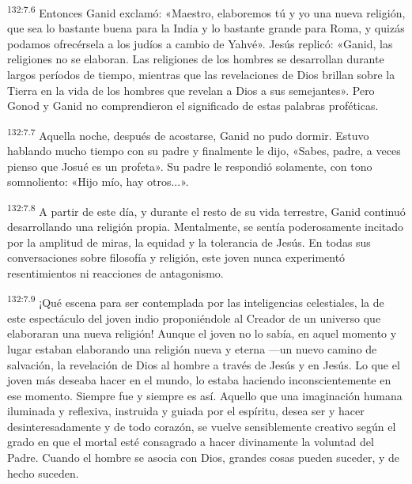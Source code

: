 \par 
\textsuperscript{132:7.6} Entonces Ganid exclamó: «Maestro, elaboremos tú y yo una nueva religión, que sea lo bastante buena para la India y lo bastante grande para Roma, y quizás podamos ofrecérsela a los judíos a cambio de Yahvé». Jesús replicó: «Ganid, las religiones no se elaboran. Las religiones de los hombres se desarrollan durante largos períodos de tiempo, mientras que las revelaciones de Dios brillan sobre la Tierra en la vida de los hombres que revelan a Dios a sus semejantes». Pero Gonod y Ganid no comprendieron el significado de estas palabras proféticas.

\par 
\textsuperscript{132:7.7} Aquella noche, después de acostarse, Ganid no pudo dormir. Estuvo hablando mucho tiempo con su padre y finalmente le dijo, «Sabes, padre, a veces pienso que Josué es un profeta». Su padre le respondió solamente, con tono somnoliento: «Hijo mío, hay otros...».

\par 
\textsuperscript{132:7.8} A partir de este día, y durante el resto de su vida terrestre, Ganid continuó desarrollando una religión propia. Mentalmente, se sentía poderosamente incitado por la amplitud de miras, la equidad y la tolerancia de Jesús. En todas sus conversaciones sobre filosofía y religión, este joven nunca experimentó resentimientos ni reacciones de antagonismo.

\par 
\textsuperscript{132:7.9} ¡Qué escena para ser contemplada por las inteligencias celestiales, la de este espectáculo del joven indio proponiéndole al Creador de un universo que elaboraran una nueva religión! Aunque el joven no lo sabía, en aquel momento y lugar estaban elaborando una religión nueva y eterna ---un nuevo camino de salvación, la revelación de Dios al hombre a través de Jesús y en Jesús. Lo que el joven más deseaba hacer en el mundo, lo estaba haciendo inconscientemente en ese momento. Siempre fue y siempre es así. Aquello que una imaginación humana iluminada y reflexiva, instruida y guiada por el espíritu, desea ser y hacer desinteresadamente y de todo corazón, se vuelve sensiblemente creativo según el grado en que el mortal esté consagrado a hacer divinamente la voluntad del Padre. Cuando el hombre se asocia con Dios, grandes cosas pueden suceder, y de hecho suceden.